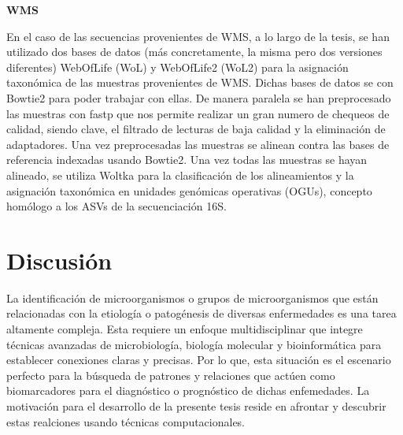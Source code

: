 \textbf{WMS}

En el caso de las secuencias provenientes de WMS, a lo largo de la tesis, se han utilizado dos bases de datos (más concretamente, la misma pero dos versiones diferentes) WebOfLife (WoL) y WebOfLife2 (WoL2) \cite{zhu2019phylogenomics} para la asignación taxonómica de las muestras provenientes de WMS. Dichas bases de datos se con Bowtie2 \cite{langmead2012fast} para poder trabajar con ellas. De manera paralela se han preprocesado las muestras con fastp \cite{chen2018fastp} que nos permite realizar un gran numero de chequeos de calidad, siendo clave, el filtrado de lecturas de baja calidad y la eliminación de adaptadores. Una vez preprocesadas las muestras se alinean contra las bases de referencia indexadas usando Bowtie2. Una vez todas las muestras se hayan alineado, se utiliza Woltka \cite{zhu2022phylogeny} para la clasificación de los alineamientos y la asignación taxonómica en unidades genómicas operativas (OGUs), concepto homólogo a los ASVs de la secuenciación 16S.




\chapter{Discusión}
\label{chap:discussion}


La identificación de microorganismos o grupos de microorganismos que están relacionadas con la etiología o patogénesis de diversas enfermedades es una tarea altamente compleja. Esta requiere un enfoque multidisciplinar que integre técnicas avanzadas de microbiología, biología molecular y bioinformática para establecer conexiones claras y precisas. Por lo que, esta situación es el escenario perfecto para la búsqueda de patrones y relaciones que actúen como biomarcadores para el diagnóstico o prognóstico de dichas enfemedades. La motivación para el desarrollo de la presente tesis reside en afrontar y descubrir estas realciones usando técnicas computacionales.


